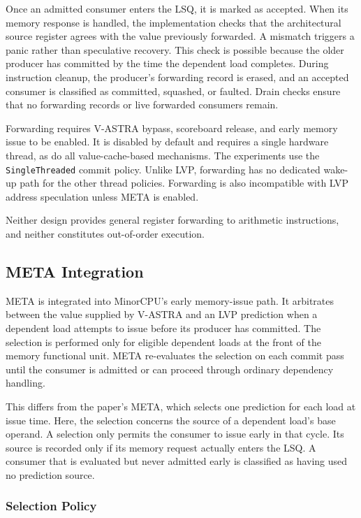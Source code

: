 Once an admitted consumer enters the LSQ, it is
marked as accepted. When its memory response is handled, the
implementation checks that the architectural source register
agrees with the value previously forwarded. A mismatch triggers
a panic rather than speculative recovery. This check is possible
because the older producer has committed by the time the
dependent load completes. During instruction cleanup, the
producer's forwarding record is erased, and an accepted
consumer is classified as committed, squashed, or faulted.
Drain checks ensure that no forwarding records or live
forwarded consumers remain.

Forwarding requires V-ASTRA bypass, scoreboard release, and
early memory issue to be enabled. It is disabled by default and
requires a single hardware thread, as do all value-cache-based
mechanisms. The experiments use the \texttt{SingleThreaded} commit
policy. Unlike LVP, forwarding has no dedicated wake-up path for the
other thread policies. Forwarding is also incompatible with LVP
address speculation unless META is enabled.

Neither design provides general register forwarding to arithmetic
instructions, and neither constitutes out-of-order execution.

\subsection{META Integration}
\label{sec:impl-meta}

META is integrated into MinorCPU's early memory-issue path. It
arbitrates between the value supplied by V-ASTRA and an LVP
prediction when a dependent load attempts to issue before its
producer has committed. The selection is performed only for
eligible dependent loads at the front of the memory functional
unit. META re-evaluates the selection on each commit pass until
the consumer is admitted or can proceed through ordinary
dependency handling.

This differs from the paper's META, which selects one prediction
for each load at issue time. Here, the selection concerns the source
of a dependent load's base operand. A selection only permits the
consumer to issue early in that cycle. Its source is recorded only if
its memory request actually enters the LSQ. A consumer
that is evaluated but never admitted early is classified as having
used no prediction source.

\subsubsection{Selection Policy}

